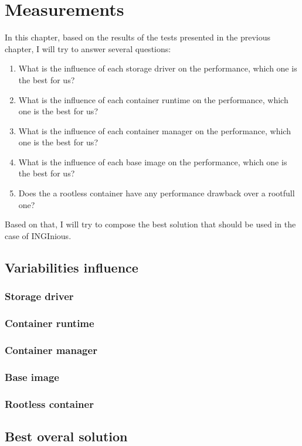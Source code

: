 \chapter{Measurements}

In this chapter, based on the results of the tests presented in the previous chapter, I will try to answer several questions:
\begin{enumerate}
  \item What is the influence of each storage driver on the performance, which one is the best for us?
  \item What is the influence of each container runtime on the performance, which one is the best for us?
  \item What is the influence of each container manager on the performance, which one is the best for us?
  \item What is the influence of each base image on the performance, which one is the best for us?
  \item Does the a rootless container have any performance drawback over a rootfull one?
\end{enumerate}

Based on that, I will try to compose the best solution that should be used in the case of INGInious.

\section{Variabilities influence}

\subsection{Storage driver}

\subsection{Container runtime}

\subsection{Container manager}

\subsection{Base image}

\subsection{Rootless container}

\section{Best overal solution}
